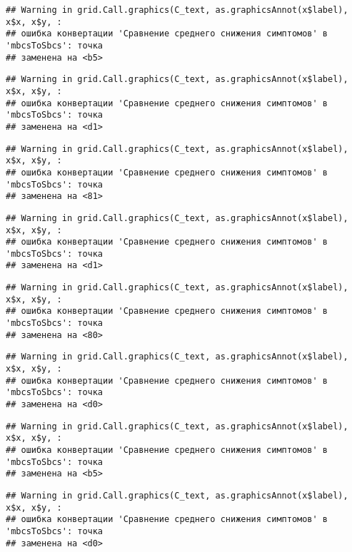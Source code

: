 \documentclass[
]{article}
\begin{document}
\begin{verbatim}
## Warning in grid.Call.graphics(C_text, as.graphicsAnnot(x$label), x$x, x$y, :
## ошибка конвертации 'Сравнение среднего снижения симптомов' в 'mbcsToSbcs': точка
## заменена на <b5>
\end{verbatim}

\begin{verbatim}
## Warning in grid.Call.graphics(C_text, as.graphicsAnnot(x$label), x$x, x$y, :
## ошибка конвертации 'Сравнение среднего снижения симптомов' в 'mbcsToSbcs': точка
## заменена на <d1>
\end{verbatim}

\begin{verbatim}
## Warning in grid.Call.graphics(C_text, as.graphicsAnnot(x$label), x$x, x$y, :
## ошибка конвертации 'Сравнение среднего снижения симптомов' в 'mbcsToSbcs': точка
## заменена на <81>
\end{verbatim}

\begin{verbatim}
## Warning in grid.Call.graphics(C_text, as.graphicsAnnot(x$label), x$x, x$y, :
## ошибка конвертации 'Сравнение среднего снижения симптомов' в 'mbcsToSbcs': точка
## заменена на <d1>
\end{verbatim}

\begin{verbatim}
## Warning in grid.Call.graphics(C_text, as.graphicsAnnot(x$label), x$x, x$y, :
## ошибка конвертации 'Сравнение среднего снижения симптомов' в 'mbcsToSbcs': точка
## заменена на <80>
\end{verbatim}

\begin{verbatim}
## Warning in grid.Call.graphics(C_text, as.graphicsAnnot(x$label), x$x, x$y, :
## ошибка конвертации 'Сравнение среднего снижения симптомов' в 'mbcsToSbcs': точка
## заменена на <d0>
\end{verbatim}

\begin{verbatim}
## Warning in grid.Call.graphics(C_text, as.graphicsAnnot(x$label), x$x, x$y, :
## ошибка конвертации 'Сравнение среднего снижения симптомов' в 'mbcsToSbcs': точка
## заменена на <b5>
\end{verbatim}

\begin{verbatim}
## Warning in grid.Call.graphics(C_text, as.graphicsAnnot(x$label), x$x, x$y, :
## ошибка конвертации 'Сравнение среднего снижения симптомов' в 'mbcsToSbcs': точка
## заменена на <d0>
\end{verbatim}
\end{document}
